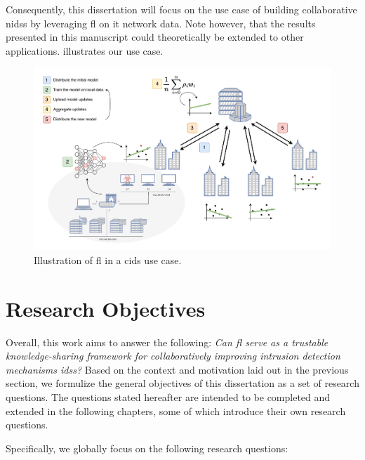 Consequently, this dissertation will focus on the use case of building collaborative \glspl{nids} by leveraging \gls{fl} on \gls{it} network data.
Note however, that the results presented in this manuscript could theoretically be extended to other applications.
 illustrates our use case.

\begin{figure}
  \centering
  \includegraphics[width=\textwidth]{./figures/fids.drawio.pdf}
  \caption{Illustration of \gls{fl} in a \gls{cids} use case.}
  \label{fig:intro.usecase}
\end{figure}

\section{Research Objectives\label{sec:intro.questions}}

Overall, this work aims to answer the following: \emph{Can \gls{fl} serve as a trustable knowledge-sharing framework for collaboratively improving intrusion detection mechanisms \glspl{ids}?}
Based on the context and motivation laid out in the previous section, we formulize the general objectives of this dissertation as a set of research questions.
The questions stated hereafter are intended to be completed and extended in the following chapters, some of which introduce their own research questions.

Specifically, we globally focus on the following research questions:

